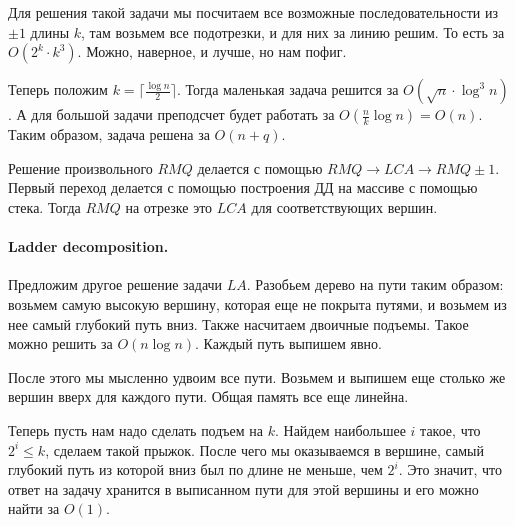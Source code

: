 \documentclass[12pt]{article}
\begin{document}
Для решения такой задачи мы посчитаем все возможные последовательности из $\pm 1$ длины $k$, там возьмем все подотрезки, и для них за линию решим. То есть за $O(2^k \cdot k^3)$. Можно, наверное, и лучше, но нам пофиг.

Теперь положим $k = \lceil \frac{\log n}{2} \rceil$. Тогда маленькая задача решится за $O(\sqrt{n} \cdot \log^3 n)$. А для большой задачи преподсчет будет работать за $O(\frac{n}{k} \log n) = O(n)$. Таким образом, задача решена за $O(n + q)$.

Решение произвольного $RMQ$ делается с помощью $RMQ \rightarrow LCA \rightarrow RMQ \pm 1$. Первый переход делается с помощью построения ДД на массиве с помощью стека. Тогда $RMQ$ на отрезке это $LCA$ для соответствующих вершин.

\paragraph{Ladder decomposition.} Предложим другое решение задачи $LA$. Разобьем дерево на пути таким образом: возьмем самую высокую вершину, которая еще не покрыта путями, и возьмем из нее самый глубокий путь вниз. Также насчитаем двоичные подъемы. Такое можно решить за $O(n \log n)$. Каждый путь выпишем явно.

После этого мы мысленно удвоим все пути. Возьмем и выпишем еще столько же вершин вверх для каждого пути. Общая память все еще линейна.

Теперь пусть нам надо сделать подъем на $k$. Найдем наибольшее $i$ такое, что $2^i \le k$, сделаем такой прыжок. После чего мы оказываемся в вершине, самый глубокий путь из которой вниз был по длине не меньше, чем $2^i$. Это значит, что ответ на задачу хранится в выписанном пути для этой вершины и его можно найти за $O(1)$.
\end{document}
